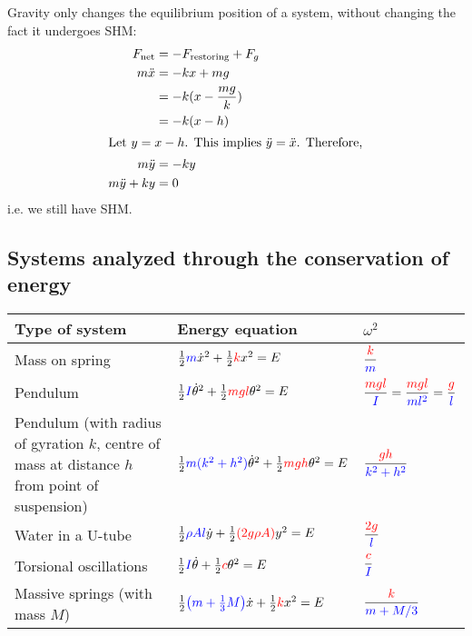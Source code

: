 \documentclass[11pt,letterpaper,titlepage,oneside]{book}
\begin{document}
Gravity only changes the equilibrium position of a system, without changing the fact it undergoes SHM:
\begin{align*}
	F_\text{net} &= -F_\text{restoring} + F_g \\
	m\ddot{x} &= -kx + mg \\
	& = -k(x - \frac{mg}{k}) \\
	& = -k(x - h) \\
	\intertext{Let $y=x-h$. This implies $\ddot{y} = \ddot{x}$. Therefore,}
	m\ddot{y} &= -ky \\
	m\ddot{y} + ky &= 0 
\end{align*}
i.e. we still have SHM.

\subsection{Systems analyzed through the conservation of energy}
\begin{center}
	\renewcommand{\arraystretch}{2.5}
	\begin{tabular}[t]{lll}
		\hline
		Type of system & Energy equation & $\omega^2$ \\ \hline
		Mass on spring &
			$\frac{1}{2}\textcolor{blue}{m}\dot{x}^2 + \frac{1}{2}\textcolor{red}{k}x^2 = E $ &
			$\dfrac{\color{red}{k}}{\color{blue}m}$
			\\
		Pendulum &
			$\frac{1}{2}\textcolor{blue}{I}\dot{\theta}^2 + \frac{1}{2}\textcolor{red}{mgl}\theta^2 = E $ &
			$\dfrac{\color{red}{mgl}}{\color{blue}{I}} = \dfrac{\color{red}{mgl}}{\color{blue}{ml^2}}= \dfrac{\color{red}{g}}{\color{blue}{l}}$ 
			\\
		\parbox{5.5cm}{Pendulum \footnotesize(with radius of gyration $k$, centre of mass at distance $h$ from point of suspension)}&
			$\frac{1}{2}\textcolor{blue}{m(k^2+h^2)}\dot{\theta}^2 + \frac{1}{2}\textcolor{red}{mgh}\theta^2 = E $ &
			$\dfrac{\color{red}{gh}}{\color{blue}{k^2+h^2}}$ 
			\\
		Water in a U-tube &
			$\frac{1}{2}\textcolor{blue}{\rho Al}\dot{y} + \frac{1}{2}\textcolor{red}{(2g\rho A)}y^2 = E$ &
			$\dfrac{\color{red}{2g}}{\color{blue}l}$ 
			\\
		Torsional oscillations &
			$\frac{1}{2}\textcolor{blue}{I}\dot{\theta} + \frac{1}{2}\textcolor{red}{c}\theta^2 = E$ &
			$\dfrac{\color{red}{c}}{\color{blue}I}$ 
			\\
		\parbox{5cm}{Massive springs \\\footnotesize{(with mass $M$)}} &
			$\frac{1}{2}\textcolor{blue}{\left(m + \frac{1}{3}M \right)}\dot{x} + \frac{1}{2}\textcolor{red}{k}x^2 = E$ &
			$\dfrac{\color{red}{k}}{\color{blue}{m + M/3}}$ 
			\\
		\hline
	\end{tabular}
	\renewcommand{\arraystretch}{1}
\end{center}
\end{document}
